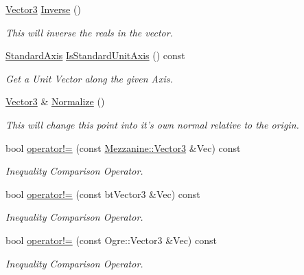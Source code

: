 \begin{DoxyCompactItemize}
\hyperlink{classMezzanine_1_1Vector3}{Vector3} \hyperlink{classMezzanine_1_1Vector3_a99846b5e24df4d20391465cf321d3a6c}{Inverse} ()
\begin{DoxyCompactList}\small\item\em This will inverse the reals in the vector. \item\end{DoxyCompactList}\item 
\hyperlink{namespaceMezzanine_ab41a00a8c6a47b576dc987ec34e16ba1}{StandardAxis} \hyperlink{classMezzanine_1_1Vector3_a854b61a98d10deacdfbcfea5a2ae68d8}{IsStandardUnitAxis} () const 
\begin{DoxyCompactList}\small\item\em Get a Unit Vector along the given Axis. \item\end{DoxyCompactList}\item 
\hyperlink{classMezzanine_1_1Vector3}{Vector3} \& \hyperlink{classMezzanine_1_1Vector3_aa8705900b168f9d5234bf6de5e9564b1}{Normalize} ()
\begin{DoxyCompactList}\small\item\em This will change this point into it's own normal relative to the origin. \item\end{DoxyCompactList}\item 
bool \hyperlink{classMezzanine_1_1Vector3_ab17e377c8178ed18adf453c6f55a2471}{operator!=} (const \hyperlink{classMezzanine_1_1Vector3}{Mezzanine::Vector3} \&Vec) const 
\begin{DoxyCompactList}\small\item\em Inequality Comparison Operator. \item\end{DoxyCompactList}\item 
bool \hyperlink{classMezzanine_1_1Vector3_a5553723899629247d1fd8031ede27c31}{operator!=} (const btVector3 \&Vec) const 
\begin{DoxyCompactList}\small\item\em Inequality Comparison Operator. \item\end{DoxyCompactList}\item 
bool \hyperlink{classMezzanine_1_1Vector3_a719f34907dcd4872bde9558b9c61dc8b}{operator!=} (const Ogre::Vector3 \&Vec) const 
\begin{DoxyCompactList}\small\item\em Inequality Comparison Operator. \item\end{DoxyCompactList}\item 

\end{DoxyCompactItemize}
